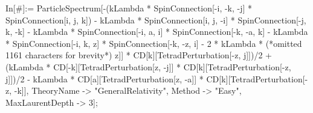 In[#]:= ParticleSpectrum[-(kLambda * SpinConnection[-i, -k, -j] * SpinConnection[i, j, k]) - kLambda * SpinConnection[i, j, -i] * SpinConnection[-j, k, -k] - kLambda * SpinConnection[-i, a, i] * SpinConnection[-k, -a, k] - kLambda * SpinConnection[-i, k, z] * SpinConnection[-k, -z, i] - 2 * kLambda * (*omitted 1161 characters for brevity*) z]] * CD[k][TetradPerturbation[-z, j]])/2 + (kLambda * CD[-k][TetradPerturbation[z, -j]] * CD[k][TetradPerturbation[-z, j]])/2 - kLambda * CD[a][TetradPerturbation[z, -a]] * CD[k][TetradPerturbation[-z, -k]], TheoryName -> "GeneralRelativity", Method -> "Easy", MaxLaurentDepth -> 3];